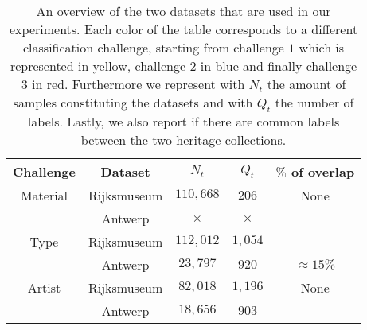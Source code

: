 \begin{table}[ht!]
\scriptsize
\centering
\caption{An overview of the two datasets that are used in our experiments. Each color of the table corresponds to a different classification challenge, starting from challenge $1$ which is represented in yellow, challenge $2$ in blue and finally challenge $3$ in red. 
Furthermore we represent with $N_t$ the amount of samples constituting the datasets and with $Q_t$ the number of labels. Lastly, we also report if there are common labels between the two heritage collections.}
\begin{tabular}{c|c|c|c|c} 
	\hline
        Challenge & Dataset & \textbf{$N_t$} & \textbf{$Q_t$} & $\%$ of overlap \\\hline
        Material & Rijksmuseum  & $110,668$ & $206$ & None \\ 
         & Antwerp & $\times$ & $\times$    \\
        Type & Rijksmuseum  & $112,012$ & $1,054$   \\
         & Antwerp & $23,797$ & $920$ & $\approx 15\%$ \\
        Artist & Rijksmuseum & $82,018$ & $1,196$  & None \\ 
         & Antwerp  & $18,656$ & $903$ \\        
	\hline
\end{tabular}
\label{table:dataset_overview}
\end{table}   
